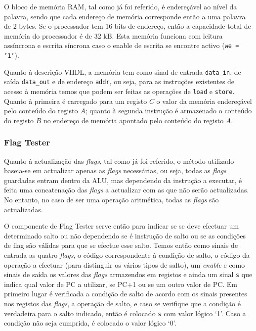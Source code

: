 \documentclass[a4paper]{article}
\begin{document}
				O bloco de memória RAM, tal como já foi referido, é endereçável ao nível da palavra, sendo que cada endereço de memória corresponde então a uma palavra de 2 bytes. Se o processador tem 16 bits de endereço, então a capacidade total de memória do processador é de 32 kB. Esta memória funciona com leitura assíncrona e escrita síncrona caso o enable de escrita se encontre activo (\texttt{we = '1'}).
				
				Quanto à descrição VHDL, a memória tem como sinal de entrada \texttt{data\_in}, de saída \texttt{data\_out} e de endereço \texttt{addr}, ou seja, para as instruções existentes de acesso à memória temos que podem ser feitas as operações de \texttt{load} e \texttt{store}. Quanto à primeira é carregado para um registo $C$ o valor da memória endereçável pelo conteúdo do registo $A$; quanto à segunda instrução é armazenado o conteúdo do registo $B$ no endereço de memória apontado pelo conteúdo do registo $A$.
				
			\subsubsection{Flag Tester}
			
				Quanto à actualização das \textit{flags}, tal como já foi referido, o método utilizado baseia-se em actualizar apenas as \textit{flags} necessárias, ou seja, todas as \textit{flags} guardadas entram dentro da ALU, mas dependendo da instrução a executar, é feita uma concatenação das \textit{flags} a actualizar com as que não serão actualizadas. No entanto, no caso de ser uma operação aritmética, todas as \textit{flags} são actualizadas.
			
				O componente de Flag Tester serve então para indicar se se deve efectuar um determinado salto ou não dependendo se é instrução de salto ou se as condições de flag são válidas para que se efectue esse salto. Temos então como sinais de entrada as quatro \textit{flags}, o código correspondente à condição de salto, o código da operação a efectuar (para distinguir os vários tipos de salto), um \textit{enable} e como sinais de saída os valores das \textit{flags} armazendos em registos e ainda um sinal \texttt{s} que indica qual valor de PC a utilizar, se PC+1 ou se um outro valor de PC. Em primeiro lugar é verificada a condição de salto de acordo com os sinais presentes nos registos das \textit{flags}, a operação de salto, e caso se verifique que a condição é verdadeira para o salto indicado, então é colocado \texttt{s} com valor lógico `1'. Caso a condição não seja cumprida, é colocado o valor lógico `0'. 
				
\end{document}
